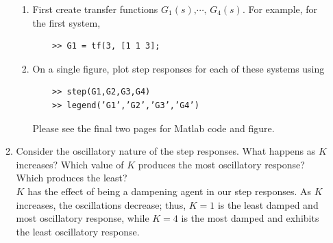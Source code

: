 \documentclass[11pt]{article}
\begin{document}
\begin{enumerate}
\begin{enumerate}
        \begin{enumerate}
            \item First create transfer functions \(G_1(s)\text{,} \cdots\text{, } G_4(s)\). For example, for the first system,
\begin{verbatim}
    >> G1 = tf(3, [1 1 3];
\end{verbatim}
            \item On a single figure, plot step responses for each of these systems using
\begin{verbatim}
    >> step(G1,G2,G3,G4)
    >> legend(’G1’,’G2’,’G3’,’G4’)
\end{verbatim}
        Please see the final two pages for Matlab code and figure.
        \end{enumerate}
        \item Consider the oscillatory nature of the step responses. What happens as \(K\) increases? Which value of \(K\) produces the most oscillatory response? Which produces the least?\\[1em]
        \(K\) has the effect of being a dampening agent in our step responses. As \(K\) increases, the oscillations decrease; thus, \(K=1\) is the least damped and most oscillatory response, while \(K=4\) is the most damped and exhibits the least oscillatory response.
    \end{enumerate}
\end{enumerate}

\end{document}
